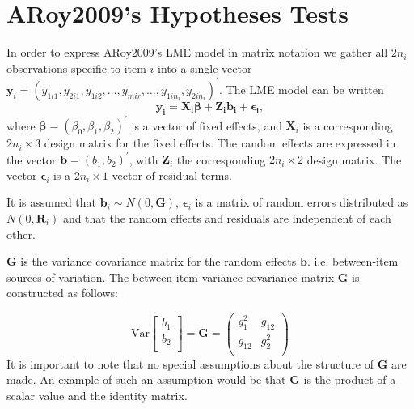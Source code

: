 \documentclass[12pt, a4paper]{report}
\theoremstyle{plain}
\theoremstyle{definition}
\theoremstyle{remark}
\begin{document}
	
	
	\newpage
	
	\section{ARoy2009's Hypotheses Tests}
	
	In order to express ARoy2009's LME model in matrix notation we gather all $2n_i$ observations specific to item $i$ into a single vector  $\boldsymbol{y}_{i} = (y_{1i1},y_{2i1},y_{1i2},\ldots,y_{mir},\ldots,y_{1in_{i}},y_{2in_{i}})^\prime.$ The LME model can be written
	\[
	\boldsymbol{y_{i}} = \boldsymbol{X_{i}\beta} + \boldsymbol{Z_{i}b_{i}} + \boldsymbol{\epsilon_{i}},
	\]
	where $\boldsymbol{\beta}=(\beta_0,\beta_1,\beta_2)^\prime$ is a vector of fixed effects, and $\boldsymbol{X}_i$ is a corresponding $2n_i\times 3$ design matrix for the fixed effects. The random effects are expressed in the vector $\boldsymbol{b}=(b_1,b_2)^\prime$, with $\boldsymbol{Z}_i$ the corresponding $2n_i\times 2$ design matrix. The vector $\boldsymbol{\epsilon}_i$ is a $2n_i\times 1$ vector of residual terms.
	
	It is assumed that $\boldsymbol{b}_i \sim N(0,\boldsymbol{G})$, $\boldsymbol{\epsilon}_i$ is a matrix of random errors distributed as $N(0,\boldsymbol{R}_i)$ and that the random effects and residuals are independent of each other.
	
	
	$\boldsymbol{G}$ is the variance covariance matrix for the random effects $\boldsymbol{b}$.
	i.e. between-item sources of variation. The between-item variance covariance matrix $\boldsymbol{G}$ is constructed as follows:
	
	\[ \mbox{Var}  \left[
	\begin{array}{c}
	b_1   \\
	b_2  \\
	\end{array}
	\right] =  \boldsymbol{G} =\left(
	\begin{array}{cc}
	g^2_1  & g_{12} \\
	g_{12} & g^2_2 \\
	\end{array}
	\right) \]
	It is important to note that no special assumptions about the structure of $\boldsymbol{G}$ are made. An example of such an assumption would be that $\boldsymbol{G}$ is the product of a scalar value and the identity matrix.
	
\end{document}
